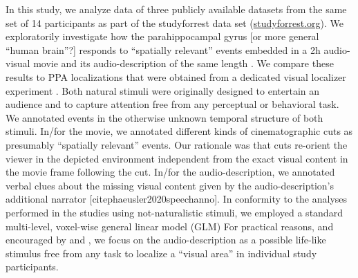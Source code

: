 \documentclass[english]{article}
\begin{document}

In this study, we analyze data of three publicly available datasets from the same set of 14 participants as part of the studyforrest data set (\href{http://www.studyforrest.org}{studyforrest.org}).
We exploratorily investigate how the parahippocampal gyrus [or more general ``human brain''?] responds to ``spatially relevant'' events embedded in a 2h audio-visual movie \citep{hanke2016simultaneous} and its audio-description of the same length \citep{hanke2014audiomovie}.
We compare these results to PPA localizations that were obtained from a dedicated visual localizer experiment \citep{sengupta2016extension}.
Both natural stimuli were originally designed to entertain an audience and to capture attention free from any perceptual or behavioral task.
We annotated events in the otherwise unknown temporal structure of both stimuli.
In/for the movie, we annotated different kinds of cinematographic cuts \citep{haeusler2016annotation} as presumably ``spatially relevant'' events.
Our rationale was that cuts re-orient the viewer in the depicted environment independent from the exact visual content in the movie frame following the cut.
In/for the audio-description, we annotated verbal clues about the missing visual content given by the audio-description's additional narrator [citep{haeusler2020speechanno}].
In conformity to the analyses performed in the studies using not-naturalistic stimuli, we employed a standard multi-level, voxel-wise general linear model (GLM) %
For practical reasons, and encouraged by \citep{aziz2008modulation} and \citep{aminoff2013role}, we focus on the audio-description as a possible life-like stimulus free from any task to localize a ``visual area'' in individual study participants.
\end{document}
